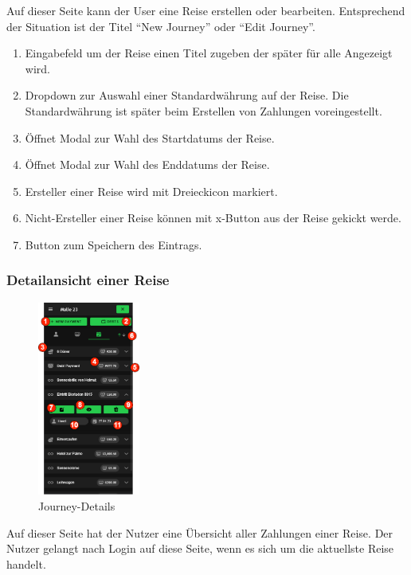 Auf dieser Seite kann der User eine Reise erstellen oder bearbeiten. Entsprechend der Situation ist der Titel  "`New Journey"' oder "`Edit Journey"'.

\begin{enumerate}[label=\protect\circled{\arabic*}]
	\item Eingabefeld um der Reise einen Titel zugeben der später für alle Angezeigt wird.
	\item Dropdown zur Auswahl einer Standardwährung auf der Reise.
	      Die Standardwährung ist später beim Erstellen von Zahlungen voreingestellt.
	\item Öffnet Modal zur Wahl des Startdatums der Reise.
	\item Öffnet Modal zur Wahl des Enddatums der Reise.
	\item Ersteller einer Reise wird mit Dreieckicon markiert.
	\item Nicht-Ersteller einer Reise können mit x-Button aus der Reise gekickt werde.
	\item Button zum Speichern des Eintrags.
\end{enumerate}

\subsubsection{Detailansicht einer Reise}\label{Journey-Details}
\begin{figure}[H]
	\centering
	\includegraphics[width=0.3\textwidth]{img/pages_numbers/journey-details.drawio}
	\caption[Journey-Details]{Journey-Details}
	\label{fig:Journey-Details}
\end{figure}

Auf dieser Seite hat der Nutzer eine Übersicht aller Zahlungen einer Reise.
Der Nutzer gelangt nach Login auf diese Seite, wenn es sich um die aktuellste Reise handelt.

